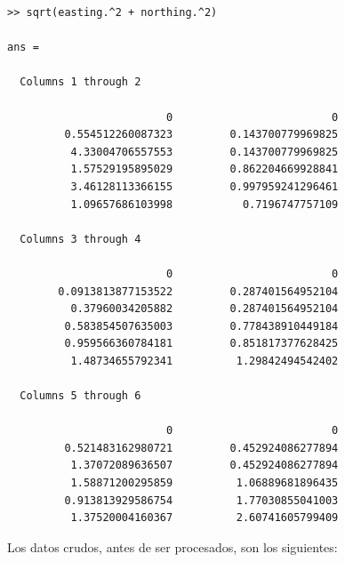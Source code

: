 \documentclass[spanish,12pt,a4paper,titlepage]{report}
\begin{document}
\begin{verbatim}
>> sqrt(easting.^2 + northing.^2)

ans =

  Columns 1 through 2

                         0                         0
         0.554512260087323         0.143700779969825
          4.33004706557553         0.143700779969825
          1.57529195895029         0.862204669928841
          3.46128113366155         0.997959241296461
          1.09657686103998           0.7196747757109

  Columns 3 through 4

                         0                         0
        0.0913813877153522         0.287401564952104
          0.37960034205882         0.287401564952104
         0.583854507635003         0.778438910449184
         0.959566360784181         0.851817377628425
          1.48734655792341          1.29842494542402

  Columns 5 through 6

                         0                         0
         0.521483162980721         0.452924086277894
          1.37072089636507         0.452924086277894
          1.58871200295859          1.06889681896435
         0.913813929586754          1.77030855041003
          1.37520004160367          2.60741605799409
\end{verbatim}

\newpage
Los datos crudos, antes de ser procesados, son los siguientes:
\end{document}
